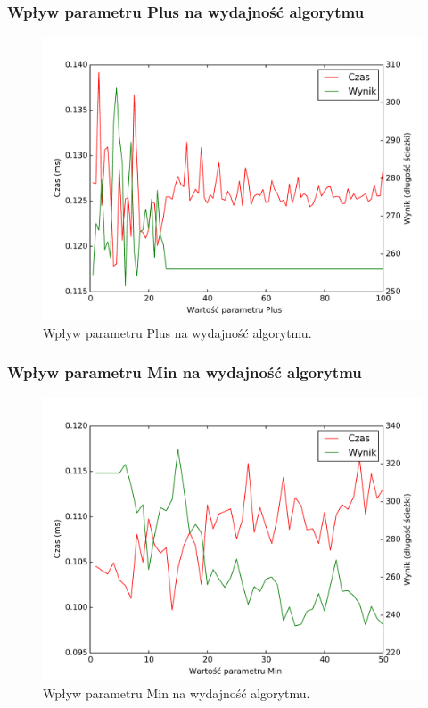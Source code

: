 \documentclass[11pt,a4paper]{article}
\begin{document}
\subsubsection{Wpływ parametru Plus na wydajność algorytmu}
\begin{figure}[H]
\includegraphics[trim = 0mm 2mm 0mm 12mm, clip, width=14cm]{graphs/plus.pdf}
\caption{Wpływ parametru Plus na wydajność algorytmu.}
\end{figure}

\subsubsection{Wpływ parametru Min na wydajność algorytmu}
\begin{figure}[H]
\includegraphics[trim = 0mm 2mm 0mm 12mm, clip, width=14cm]{graphs/min.pdf}
\caption{Wpływ parametru Min na wydajność algorytmu.}
\end{figure}
\end{document}
